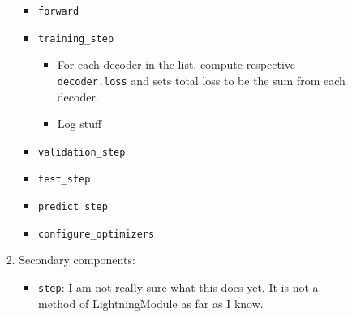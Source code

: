 \begin{itemize}
\begin{enumerate}
\begin{enumerate}
\begin{enumerate}
\begin{itemize}
                                \item \texttt{forward}

                                \item \texttt{training\_step}
                                    \begin{itemize}
                                        \item For each decoder in the list, compute respective \texttt{decoder.loss} and sets total loss to be the sum from each decoder.
                                        \item Log stuff
                                    \end{itemize}

                                \item \texttt{validation\_step}

                                \item \texttt{test\_step}

                                \item \texttt{predict\_step}

                                \item \texttt{configure\_optimizers}
                            \end{itemize}

                            \item Secondary components:
                            \begin{itemize}
                                \item \texttt{step}: I am not really sure what this does yet. It is not a method of LightningModule as far as I know.
                            \end{itemize}
                        \end{enumerate}

                \end{enumerate}
        \end{enumerate}
\end{itemize}

